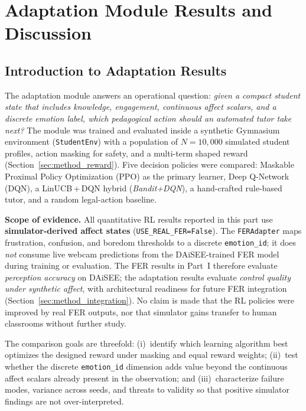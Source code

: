 
\section{Adaptation Module Results and Discussion}\label{sec:results_adapt_part}

\subsection{Introduction to Adaptation Results}\label{sec:results_adapt_intro}

The adaptation module answers an operational question: \emph{given a compact student state that includes knowledge, engagement, continuous affect scalars, and a discrete emotion label, which pedagogical action should an automated tutor take next?} The module was trained and evaluated inside a synthetic Gymnasium environment (\texttt{StudentEnv}) with a population of $N=10{,}000$ simulated student profiles, action masking for safety, and a multi-term shaped reward (Section~\ref{sec:method_reward}). Five decision policies were compared: Maskable Proximal Policy Optimization (PPO) as the primary learner, Deep Q-Network (DQN), a LinUCB\,+\,DQN hybrid (\emph{Bandit+DQN}), a hand-crafted rule-based tutor, and a random legal-action baseline.

\textbf{Scope of evidence.} All quantitative RL results reported in this part use \textbf{simulator-derived affect states} (\texttt{USE\_REAL\_FER=False}). The \texttt{FERAdapter} maps frustration, confusion, and boredom thresholds to a discrete \texttt{emotion\_id}; it does \emph{not} consume live webcam predictions from the DAiSEE-trained FER model during training or evaluation. The FER results in Part~I therefore evaluate \emph{perception accuracy} on DAiSEE; the adaptation results evaluate \emph{control quality under synthetic affect}, with architectural readiness for future FER integration (Section~\ref{sec:method_integration}). No claim is made that the RL policies were improved by real FER outputs, nor that simulator gains transfer to human classrooms without further study.

The comparison goals are threefold: (i)~identify which learning algorithm best optimizes the designed reward under masking and equal reward weights; (ii)~test whether the discrete \texttt{emotion\_id} dimension adds value beyond the continuous affect scalars already present in the observation; and (iii)~characterize failure modes, variance across seeds, and threats to validity so that positive simulator findings are not over-interpreted.

